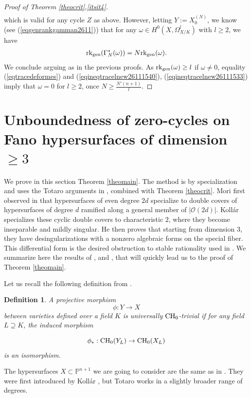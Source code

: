 \documentclass[10pt]{article}
\newtheorem{Defi}[theo]{Definition}
\begin{document}
\begin{proof}[Proof of Theorem \ref{theocrit},\ref{itsit4}]
\begin{eqnarray}
\end{eqnarray}
which is valid for any cycle $Z$ as above.
However, letting $Y:=X^{(N)}_0$, we know (see (\ref{eqgenrankgamman2611})) that
for any $\omega\in H^0(X,\Omega_{X/K}^l)$  with $l\geq 2$, we have
\begin{eqnarray}\label{eqineqtracelnew26111540} {\rm rk}_{\rm gen}(\Gamma_N^*(\omega))=N {\rm rk}_{\rm gen}(\omega) .
\end{eqnarray}
We conclude arguing as  in the previous proofs. As ${\rm rk}_{\rm gen}(\omega)\geq l$ if $\omega\not=0$, equality (\ref{eqtracedeformes}) and (\ref{eqineqtracelnew26111540}), (\ref{eqineqtracelnew26111533}) imply that $\omega=0$ for $l\geq 2$, once $N\geq \frac{N'(n+1)}{l}$.
\end{proof}
\section{Unboundedness of zero-cycles on Fano hypersurfaces of dimension $\geq 3$\label{sectheomain}}
We prove in this section Theorem \ref{theomain}.
The method is by specialization and uses the Totaro arguments in \cite{totaro}, combined with Theorem \ref{theocrit}.  Mori first observed in \cite{mori} that hypersurfaces of even degree  $2d$ specialize to double covers of hypersurfaces of degree $d$ ramified along a general member of $|\mathcal{O}(2d)|$. Koll\'ar specializes these cyclic double covers to characteristic $2$, where they become inseparable and mildly singular. He then proves that starting from dimension $3$,   they have desingularizations with a nonzero algebraic forms on the special fiber. This differential form is the desired obstruction to stable rationality used in \cite{totaro}.  We summarize here the results of \cite{kollar}, \cite{kollarbook} and \cite{totaro}, that will quickly lead us to  the proof of Theorem \ref{theomain}.

Let us recall the following definition  from \cite{CTPi}.
\begin{Defi} \label{defiCTPi} A
 projective morphism
$$\phi: Y\rightarrow X$$ between varieties defined over a field $K$ is universally ${\rm CH}_0$-trivial if for any
field $L \supseteq K$, the induced morphism

$$\phi_*:{\rm CH}_0(Y_{L})\rightarrow {\rm CH}_0(X_L)$$
is an isomorphism.
\end{Defi}
The hypersurfaces $X\subset \mathbb{P}^{n+1}$ we are going to consider are the same as in \cite{totaro}. They were first introduced  by Koll\'ar \cite{kollar}, but Totaro works in a slightly broader range of degrees.
\end{document}
